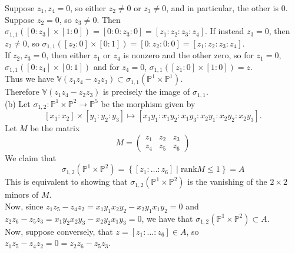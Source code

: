 \documentclass[a4paper]{article}
\begin{document}
Suppose $z_1, z_4 = 0$, so either $z_2 \neq 0$ or $z_3 \neq 0$, and in
particular, the other is $0$. Suppose $z_2 = 0$, so $z_3 \neq 0$. Then
$\sigma_{1,1} \left( 
\left[ 0 : z_3 \right] \times \left[ 1 : 0 \right] \right) 
= \left[ 0 : 0 : z_3 : 0 \right] 
= \left[ z_1 : z_2 : z_3 : z_4 \right] $. If instead
$z_3 = 0$, then $z_2 \neq  0$, so
$\sigma_{1,1} \left( \left[ 
z_2 : 0\right] \times \left[ 0 : 1 \right]  \right) 
= \left[ 0 : z_2 : 0 : 0 \right] 
= \left[ z_1 : z_2 : z_3 : z_4 \right] $.\\
If $z_2, z_3 = 0$, then either $z_1$ or $z_4$ is nonzero and the other zero, so
for
$z_1 = 0$,
$\sigma_{1,1} \left( 
\left[ 0 : z_4 \right] \times \left[ 0 : 1 \right]  \right) $ and for
$z_4 = 0$,
$\sigma_{1,1}\left( \left[ z_1 : 0 \right] \times \left[ 1 :0 \right]  \right) 
= z$.\\
\linebreak
Thus we have 
$\mathbb{V} \left( z_1 z_4 - z_2 z_3 \right) 
\subset \sigma_{1,1}\left( \mathbb{P}^{1}\times \mathbb{P}^{1} \right) $.\\
Therefore $\mathbb{V}\left( z_1 z_4 - z_2 z_3 \right) $ is precisely the image
of $\sigma_{1,1}$.\\
\linebreak
(b) Let $\sigma_{1,2}  \colon \mathbb{P}^{1} \times \mathbb{P}^2 \to
\mathbb{P}^{5}$ be the morphism given by
\[
\left[ x_1 : x_2 \right] \times 
\left[ y_1 : y_2 : y_3 \right] 
\mapsto \left[ x_1 y_1 : x_1 y_2 : x_1 y_3 : x_2 y_1 : x_2 y_2 : x_2 y_3
\right] .
\] 
Let $M$ be the matrix
\[
    M = \begin{pmatrix} z_1 & z_2 & z_3\\
    z_4 & z_5 & z_6 \end{pmatrix} 
\] 
We claim that
 \[
\sigma_{1,2} \left( \mathbb{P}^{1} \times \mathbb{P}^{2} \right) 
= \left\{ 
\left[ z_1 : \ldots : z_6 \right]  \mid 
\text{rank}M \le 1 \right\} = A
\] 
This is equivalent to showing that
$\sigma_{1,2}\left( \mathbb{P}^{1}\times \mathbb{P}^2 \right) $ is the
vanishing
of the  $2 \times 2$ minors of $M$.\\
\linebreak
Now, since $z_1 z_5 - z_4 z_2 = x_1 y_1 x_2 y_2
- x_2 y_1 x_1 y_2 = 0$ and
$z_2 z_6 - z_5 z_3 = x_1 y_2 x_2 y_3 - x_2 y_2 x_1 y_3 = 0$, we have that
$\sigma_{1,2}\left( \mathbb{P}^{1}\times \mathbb{P}^2 \right) 
\subset A   $.\\
\linebreak
Now, suppose conversely, that
$z = \left[ z_1 : \ldots : z_6 \right] 
\in A$, so
$z_1 z_5 - z_4 z_2 = 0 = z_2 z_6 - z_5 z_3$.\\
\end{document}
